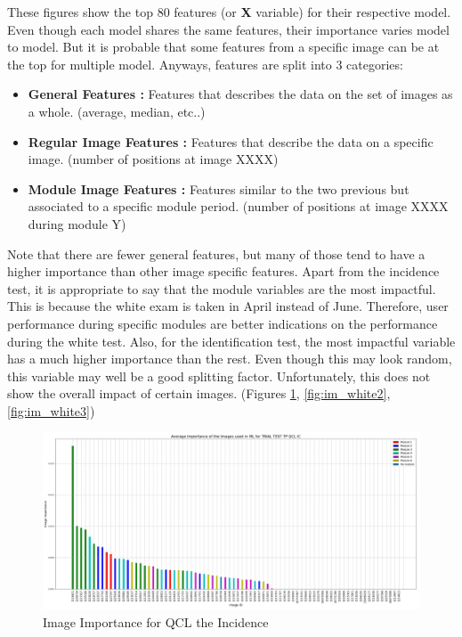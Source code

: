 \documentclass[a4paper,11pt]{report}
\numberwithin{figure}{chapter} %
\begin{document}
    These figures show the top 80 features (or \textbf{X} variable) for their respective model.
    Even though each model shares the same features, their importance varies model to model.
    But it is probable that some features from a specific image can be at the top for multiple model.
    Anyways, features are split into 3 categories:
    \begin{itemize}
    \item[\textbullet] \textbf{General Features :} Features that describes the data on the set of images as a whole. (average, median, etc..)
    \item[\textbullet] \textbf{Regular Image Features :} Features that describe the data on a specific image. (number of positions at image XXXX)
    \item[\textbullet] \textbf{Module Image Features :} Features similar to the two previous but associated to a specific module period. (number of positions at image XXXX during module Y)
    \end{itemize}

    Note that there are fewer general features, but many of those tend to have a higher importance than other image specific features.
    Apart from the incidence test, it is appropriate to say that the module variables are the most impactful.
    This is because the white exam is taken in April instead of June.
    Therefore, user performance during specific modules are better indications on the performance during the white test.
    Also, for the  identification test, the most impactful variable has a much higher importance than the rest.
    Even though this may look random, this variable may well be a good splitting factor.
    Unfortunately, this does not show the overall impact of certain images. (Figures \ref{fig:im_white1}, \ref{fig:im_white2}, \ref{fig:im_white3})

      \begin{figure}[H]
      \centering
      \includegraphics[width=.99\linewidth]{plots/im_importance_TRIAL_TEST_TP_QCL_IC_2018-04-29_14_31_20.png}
      \caption{Image Importance for QCL the Incidence}
      \label{fig:im_white1}
      \end{figure}
\end{document}

